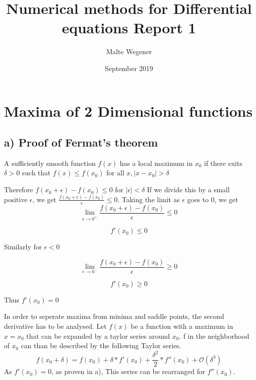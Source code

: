 \documentclass{article}
\title{Numerical methods for Differential equations Report 1}
\author{Malte Wegener}
\date{September 2019}
\begin{document}
\maketitle
    
\section{Maxima of  2 Dimensional functions}
\subsection{a) Proof of Fermat's theorem}

A sufficiently smooth function $f(x)$ has a local maximum in $x_{0}$ if there exits $\delta > 0$ such that $f(x) \leq f(x_{0})$ for all $x, \mid x - x_{0} \mid > \delta$ \par
Therefore $f(x_{0}+\epsilon)-f(x_{0}) \leq 0$ for $\mid \epsilon \mid < \delta$
If we divide this by a small positive $\epsilon$, we get $\frac{f(x_{0}+\epsilon)-f(x_{0})}{\epsilon}\leq 0$.
Taking the limit as $\epsilon$ goes to 0, we get
\begin{equation*}
   \lim_{\epsilon\to 0^{+}} \frac{f(x_{0}+\epsilon)-f(x_{0})}{\epsilon}\leq 0
\end{equation*}

\begin{equation*}
   f'(x_{0})\leq 0
\end{equation*}

Similarly for $\epsilon < 0$

\begin{equation*}
   \lim_{\epsilon\to 0^{-}} \frac{f(x_{0}+\epsilon)-f(x_{0})}{\epsilon}\geq 0
  \end{equation*}
   
\begin{equation*}
   f'(x_{0})\geq 0
\end{equation*}

Thus $f'(x_{0}) = 0$

In order to seperate maxima from minima and saddle points, the second derivative has to be analysed.
Let $f(x)$ be a function with a maximum in $x=x_{0}$ that can be expanded by a taylor series around $x_{0}$. f in the neighborhood of $x_{0}$ can than be described by the following Taylor series.
\begin{equation*}
    f(x_{0}+\delta) = f(x_{0})+\delta*f'(x_{0})+\frac{\delta^2}{2}*f''(x_{0}) + \mathcal{O}(\delta^3)
\end{equation*}
As $f'(x_{0}) = 0$, as proven in a), This series can be rearranged for $f''(x_{0})$.
\end{document}
